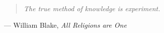 \documentclass[
  paper=a4,
  fontsize=11pt,
  twoside=false,
  BCOR=10mm,
  DIV=11,
  parskip=half,
  numbers=noenddot,
  bibliography=totoc,
  listof=totoc,
  open=any,
  chapterprefix=true,
]{scrreprt}
\begin{document}
\bigskip
\begin{quote}
\itshape
The true method of knowledge is experiment.
\end{quote}
\begin{flushright}
--- William Blake, \emph{All Religions are One}
\end{flushright}

\cleardoublepage
\tableofcontents

\cleardoublepage
\listoffigures

\cleardoublepage
\listoftables

\cleardoublepage


\cleardoublepage







\appendix


\cleardoublepage
\printbibliography[heading=bibintoc]
\end{document}
